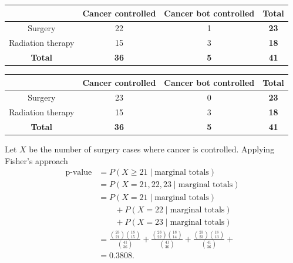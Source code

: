 \documentclass[a4paper]{article}
\begin{document}
\begin{table}[H]
	\centering
	\begin{tabular}{@{}c|cc|c@{}}
	\toprule
				      & \textbf{Cancer controlled} & \textbf{Cancer bot controlled} & \textbf{Total} \\ \midrule
	Surgery           & \textcolor{myred}{22}      & 1                              & \textbf{23}    \\
	Radiation therapy & 15                         & 3                              & \textbf{18}    \\ \midrule
	\textbf{Total}    & \textbf{36}                & \textbf{5}                     & \textbf{41}    \\ \bottomrule
	\end{tabular}
\end{table}
\begin{table}[H]
	\centering
	\begin{tabular}{@{}c|cc|c@{}}
	\toprule
				      & \textbf{Cancer controlled} & \textbf{Cancer bot controlled} & \textbf{Total} \\ \midrule
	Surgery           & \textcolor{myred}{23}      & 0                              & \textbf{23}    \\
	Radiation therapy & 15                         & 3                              & \textbf{18}    \\ \midrule
	\textbf{Total}    & \textbf{36}                & \textbf{5}                     & \textbf{41}    \\ \bottomrule
	\end{tabular}
\end{table}
Let \( X \) be the number of surgery cases where cancer is controlled. Applying Fisher's approach
\begin{align*}
	\text{p-value}  
	&= P (X \geq 21 \mid \text{marginal totals} )\\
	&= P (X = 21, 22, 23 \mid \text{marginal totals} )\\
	&= P (X = 21 \mid \text{marginal totals} ) \\
	  & \qquad {} + P (X = 22 \mid \text{marginal totals} )\\
	  & \qquad {} + P (X = 23 \mid \text{marginal totals} )\\
	&= \frac{\binom{23}{21} \binom{18}{15}}{\binom{41}{36}} + \frac{\binom{23}{22} \binom{18}{14}}{\binom{41}{36}} + \frac{\binom{23}{23} \binom{18}{13}}{\binom{41}{36}} + \\
	&=  0.3808.
\end{align*}
\end{document}
